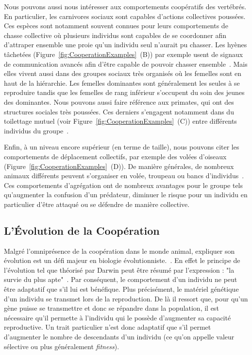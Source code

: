 		Nous pouvons aussi nous intéresser aux comportements coopératifs des vertébrés. En particulier, les carnivores sociaux sont capables d'actions collectives poussées. Ces espèces sont notamment souvent connues pour leurs comportements de chasse collective où plusieurs individus sont capables de se coordonner afin d'attraper ensemble une proie qu'un individu seul n'aurait pu chasser. Les hyènes tâchetées (Figure~\ref{fig:CooperationExamples}~(B)) par exemple usent de signaux de communication avancés afin d'être capable de pouvoir chasser ensemble~\parencite{Drea2009a, Smith2010, Smith2012a}. Mais elles vivent aussi dans des groupes sociaux très organisés où les femelles sont en haut de la hiérarchie. Les femelles dominantes sont généralement les seules à se reproduire tandis que les femelles de rang inférieur s'occupent du soin des jeunes des dominantes. Nous pouvons aussi faire référence aux primates, qui ont des structures sociales très poussées. Ces derniers s'engagent notamment dans du toilettage mutuel (voir Figure~\ref{fig:CooperationExamples}~(C)) entre différents individus du groupe~\parencite{Spruijt1992}.

		Enfin, à un niveau encore supérieur (en terme de taille), nous pouvons citer les comportements de déplacement collectifs, par exemple des volées d'oiseaux (Figure~\ref{fig:CooperationExamples}~(D)). De manière générales, de nombreux animaux différents peuvent s'organiser en volée, troupeau ou bancs d'individus~\parencite{Couzin2002, Couzin2003}. Ces comportements d'agrégation ont de nombreux avantages pour le groupe tels qu'augmenter la confusion d'un prédateur, diminuer le risque pour un individu en particulier d'être attaqué ou se défendre de manière collective.


	\subsection{L'Évolution de la Coopération}

		Malgré l'omniprésence de la coopération dans le monde animal, expliquer son évolution est un défi majeur en biologie évolutionniste.~\parencite{Hamilton1964, Dugatkin2002, West2011a}. En effet le principe de l'évolution tel que théorisé par Darwin peut être résumé par l'expression : "la survie du plus apte"~\parencite{Darwin1859}. Par conséquent, le comportement d'un individu ne peut être adaptatif que s'il lui est bénéfique. Plus précisément, le matériel génétique d'un individu se transmet lors de la reproduction. De là il ressort que, pour qu'un gène puisse se transmettre et donc se répandre dans la population, il est nécessaire qu'il permette à l'individu qui le possède d'augmenter sa capacité reproductive. Un trait particulier n'est donc adaptatif que s'il permet d'augmenter le nombre de descendants d'un individu (ce qu'on appelle valeur sélective ou plus généralement \emph{fitness}).

